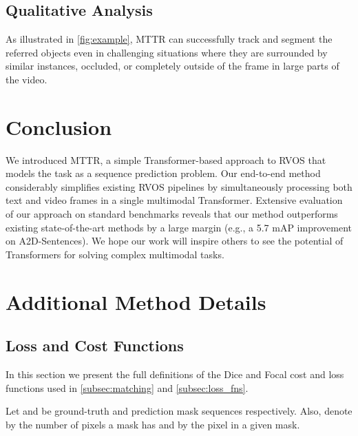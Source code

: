 \documentclass[10pt,twocolumn,letterpaper]{article}
\renewcommand{\cite}[1]{\citep{#1}}
\newcommand{\methodname}{MTTR}
\begin{document}
\subsection{Qualitative Analysis}
As illustrated in \cref{fig:example}, \methodname{} can successfully track and segment the referred objects even in challenging situations where they are surrounded by similar instances, occluded, or completely outside of the frame in large parts of the video. \section{Conclusion}
\label{sec:conclusion}
We introduced \methodname, a simple Transformer-based approach to RVOS that models the task as a sequence prediction problem. Our end-to-end method considerably simplifies existing RVOS pipelines by simultaneously processing both text and video frames in a single multimodal Transformer. Extensive evaluation of our approach on standard benchmarks reveals that our method outperforms existing state-of-the-art methods by a large margin (e.g., a 5.7 mAP improvement on A2D-Sentences). We hope our work will inspire others to see the potential of Transformers for solving complex multimodal tasks.  
\clearpage

{\small


}

\clearpage
\appendix{}
\renewcommand\thefigure{\thesection.\arabic{figure}} 
\renewcommand\thetable{\thesection.\arabic{table}} 
\renewcommand\theequation{\thesection.\arabic{equation}}  
\setcounter{figure}{0}  
\setcounter{table}{0}


\section{Additional Method Details}
\subsection{Loss and Cost Functions}
\label{loss_and_cost_appendix}
In this section we present the full definitions of the Dice \cite{milletari2016vnet} and Focal \cite{lin2017focal} cost and loss functions used in \cref{subsec:matching} and \cref{subsec:loss_fns}.

Let  and  be ground-truth and prediction mask sequences respectively. Also, denote by  the number of pixels a mask has and by  the  pixel in a given mask.
\end{document}
